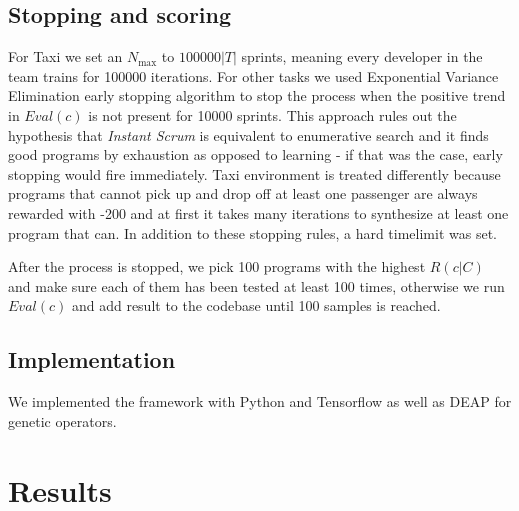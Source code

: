 \subsection{Stopping and scoring}

For Taxi we set an $N_\text{max}$ to $100000 |T|$ sprints, meaning every developer in the team trains for 100000 iterations.
For other tasks we used Exponential Variance Elimination \cite{evestop} early stopping algorithm to stop the process when the positive trend in $Eval(c)$ is not present for 10000 sprints.
This approach rules out the hypothesis that \emph{Instant Scrum} is equivalent to enumerative search and it finds good programs by exhaustion as opposed to learning - if that was the case, early stopping would fire immediately.
Taxi environment is treated differently because programs that cannot pick up and drop off at least one passenger are always rewarded with -200 and at first it takes many iterations to synthesize at least one program that can.
In addition to these stopping rules, a hard timelimit was set.

After the process is stopped, we pick 100 programs with the highest $R(c|C)$ and make sure each of them has been tested at least 100 times, otherwise we run $Eval(c)$ and add result to the codebase until 100 samples is reached. 

\subsection{Implementation}

We implemented the framework with Python and Tensorflow as well as DEAP \cite{deap} for genetic operators.

\section{Results}
\label{sec:results}

